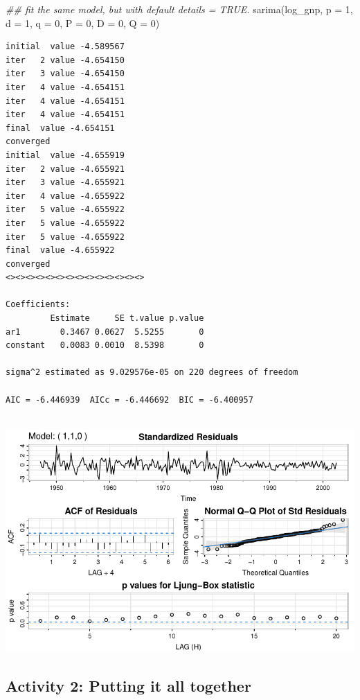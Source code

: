 \documentclass[
  letterpaper,
  DIV=11,
  numbers=noendperiod]{scrartcl}
\newenvironment{Shaded}{\begin{snugshade}}{\end{snugshade}}
\newcommand{\AttributeTok}[1]{\textcolor[rgb]{0.40,0.45,0.13}{#1}}
\newcommand{\DecValTok}[1]{\textcolor[rgb]{0.68,0.00,0.00}{#1}}
\newcommand{\DocumentationTok}[1]{\textcolor[rgb]{0.37,0.37,0.37}{\textit{#1}}}
\newcommand{\FunctionTok}[1]{\textcolor[rgb]{0.28,0.35,0.67}{#1}}
\newcommand{\NormalTok}[1]{\textcolor[rgb]{0.00,0.23,0.31}{#1}}
\begin{document}
\begin{Shaded}
\begin{Highlighting}[]
\DocumentationTok{\#\# fit the same model, but with default details = TRUE.}
\FunctionTok{sarima}\NormalTok{(log\_gnp, }\AttributeTok{p =} \DecValTok{1}\NormalTok{, }\AttributeTok{d =} \DecValTok{1}\NormalTok{, }\AttributeTok{q =} \DecValTok{0}\NormalTok{, }\AttributeTok{P =} \DecValTok{0}\NormalTok{, }\AttributeTok{D =} \DecValTok{0}\NormalTok{, }\AttributeTok{Q =} \DecValTok{0}\NormalTok{)}
\end{Highlighting}
\end{Shaded}

\begin{verbatim}
initial  value -4.589567 
iter   2 value -4.654150
iter   3 value -4.654150
iter   4 value -4.654151
iter   4 value -4.654151
iter   4 value -4.654151
final  value -4.654151 
converged
initial  value -4.655919 
iter   2 value -4.655921
iter   3 value -4.655921
iter   4 value -4.655922
iter   5 value -4.655922
iter   5 value -4.655922
iter   5 value -4.655922
final  value -4.655922 
converged
<><><><><><><><><><><><><><>
 
Coefficients: 
         Estimate     SE t.value p.value
ar1        0.3467 0.0627  5.5255       0
constant   0.0083 0.0010  8.5398       0

sigma^2 estimated as 9.029576e-05 on 220 degrees of freedom 
 
AIC = -6.446939  AICc = -6.446692  BIC = -6.400957 
 
\end{verbatim}

\includegraphics{Lecture12_files/figure-pdf/unnamed-chunk-4-1.pdf}

\subsection{Activity 2: Putting it all
together}\label{activity-2-putting-it-all-together}
\end{document}
